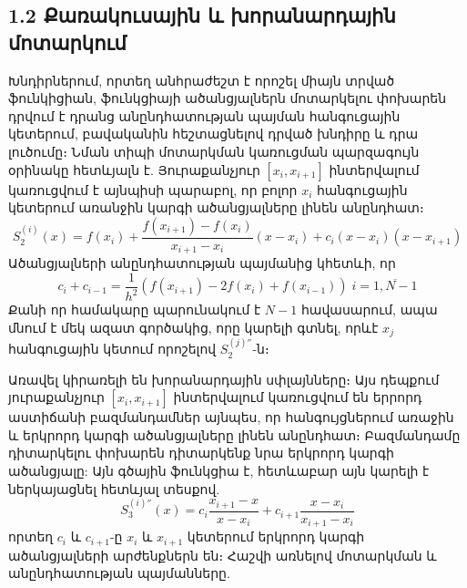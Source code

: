 \documentclass[fleqn, bachelor,subf,12pt,notitlepage]{article}
\begin{document}
\subsection*{{1.2 Քառակուսային և խորանարդային մոտարկում}}
Խնդիրներում, որտեղ անհրաժեշտ է որոշել միայն տրված ֆունկիցիան, ֆունկցիայի ածանցյալներն մոտարկելու փոխարեն դրվում է դրանց անընդհատության պայման հանգուցային կետերում,  բավականին հեշտացնելով դրված խնդիրը և դրա լուծումը։
Նման տիպի մոտարկման կառուցման պարզագույն օրինակը հետևյալն է.
Յուրաքանչյուր $\left[x_{i}, x_{i+1}\right]$ ինտերվալում կառուցվում է այնպիսի պարաբոլ, որ բոլոր $x_{i}$ հանգուցային կետերում առանջին կարգի ածանցյալները լինեն անընդհատ։
\begin{equation}
S_{2}^{(i)}(x)=f(x_{i})+\dfrac{f(x_{i+1})-f(x_{i})}{x_{i+1}-x_{i}}\left(x-x_{i}\right)+c_{i}\left(x-x_{i}\right)\left(x-x_{i+1}\right)
\end{equation}
Ածանցյալների անընդհատության պայմանից կհետևի, որ
\begin{equation}
c_{i}+c_{i-1}=\dfrac{1}{h^{2}}\left(f(x_{i+1})-2f(x_{i})+f(x_{i-1})\right) \; i=\overline{1, N-1}
\end{equation}
Քանի որ համակարը պարունակում է $N-1$ հավասարում, ապա մնում է մեկ ազատ գործակից, որը կարելի գտնել, որևէ $x_{j}$ հանգուցային կետում որոշելով $S_{2}^{(j)''}$-ն։

Առավել կիրառելի են խորանարդային սփլայնները։ Այս դեպքում յուրաքանչյուր $\left[x_{i}, x_{i+1}\right]$ ինտերվալում կառուցվում են երրորդ աստիճանի բազմանդամներ այնպես, որ հանգույցներում առաջին և երկրորդ կարգի ածանցյալները լինեն անընդհատ։ 
Բազմանդամը դիտարկելու փոխարեն դիտարկենք նրա երկրորդ կարգի ածանցյալը: Այն գծային ֆունկցիա է, հետևաբար այն կարելի է ներկայացնել հետևյալ տեսքով.
\begin{equation}
S^{(i)''}_3(x)=c_{i}\dfrac{x_{i+1}-x}{x-x_{i}}+c_{i+1}\dfrac{x-x_{i}}{x_{i+1}-x_{i}}
\end{equation}
\noindent որտեղ $c_{i}$ և $c_{i+1}$-ը $x_{i}$ և $x_{i+1}$ կետերում երկրորդ կարգի ածանցյալների արժենքներն են։ 
\noindent Հաշվի առնելով մոտարկման և անընդհատության պայմանները.
\end{document}
